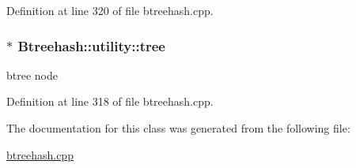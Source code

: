 Definition at line 320 of file btreehash.\-cpp.

\hypertarget{class_btreehash_1_1utility_a6ecabb5427a477c9406cc7c2825766fd}{
\subsubsection[{tree}]{$\ast$ Btreehash\-::utility\-::tree}}\label{class_btreehash_1_1utility_a6ecabb5427a477c9406cc7c2825766fd}


btree node 



Definition at line 318 of file btreehash.\-cpp.



The documentation for this class was generated from the following file\-:\begin{DoxyCompactItemize}
\item 
\hyperlink{btreehash_8cpp}{btreehash.\-cpp}\end{DoxyCompactItemize}
